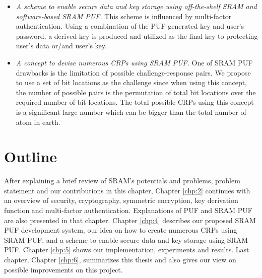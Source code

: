 \begin{itemize}
    \item \textit{A scheme to enable secure data and key storage using off-the-shelf SRAM and software-based SRAM PUF.} This scheme is influenced by multi-factor authentication. Using a combination of the PUF-generated key and user's password, a derived key is produced and utilized as the final key to protecting user's data or/and user's key.
    \item \textit{A concept to devise numerous CRPs using SRAM PUF.} One of SRAM PUF drawbacks is the limitation of possible challenge-response pairs. We propose to use a set of bit locations as the challenge since when using this concept, the number of possible pairs is the permutation of total bit locations over the required number of bit locations. The total possible CRPs using this concept is a significant large number which can be bigger than the total number of atom in earth.
\end{itemize}


\section{Outline}
After explaining a brief review of SRAM's potentials and problems, problem statement and our contributions in this chapter,
Chapter \ref{chp:2} continues with an overview of security, cryptography, symmetric encryption, key derivation function and multi-factor authentication. Explanations of PUF and SRAM PUF are also presented in that chapter. Chapter \ref{chp:4} describes our proposed SRAM PUF development system, our idea on how to create numerous CRPs using SRAM PUF, and a scheme to enable secure data and key storage using SRAM PUF. Chapter \ref{chp:5} shows our implementation, experiments and results. Last chapter, Chapter \ref{chp:6}, summarizes this thesis and also gives our view on possible improvements on this project.
